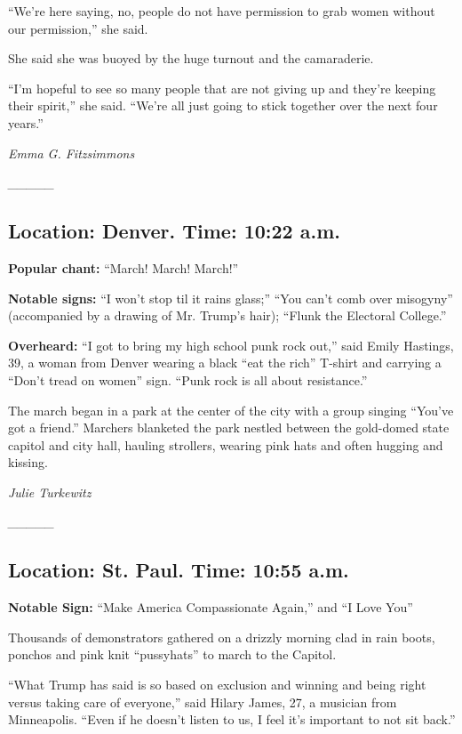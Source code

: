 ``We're here saying, no, people do not have permission to grab women
without our permission,'' she said.

She said she was buoyed by the huge turnout and the camaraderie.

``I'm hopeful to see so many people that are not giving up and they're
keeping their spirit,'' she said. ``We're all just going to stick
together over the next four years.''

\emph{Emma G. Fitzsimmons}

\emph{\_\_\_\_\_}

\hypertarget{location-denver-time-1022-am}{%
\subsection{Location: Denver. Time: 10:22
a.m.}\label{location-denver-time-1022-am}}

\textbf{Popular chant:} ``March! March! March!''

\textbf{Notable signs:} ``I won't stop til it rains glass;'' ``You can't
comb over misogyny'' (accompanied by a drawing of Mr. Trump's hair);
``Flunk the Electoral College.''

\textbf{Overheard:} ``I got to bring my high school punk rock out,''
said Emily Hastings, 39, a woman from Denver wearing a black ``eat the
rich'' T-shirt and carrying a ``Don't tread on women'' sign. ``Punk rock
is all about resistance.''

The march began in a park at the center of the city with a group singing
``You've got a friend.'' Marchers blanketed the park nestled between the
gold-domed state capitol and city hall, hauling strollers, wearing pink
hats and often hugging and kissing.

\emph{Julie Turkewitz}

\emph{\_\_\_\_\_}

\hypertarget{location-st-paul-time-1055-am}{%
\subsection{Location: St. Paul. Time: 10:55
a.m.}\label{location-st-paul-time-1055-am}}

\textbf{Notable Sign:} ``Make America Compassionate Again,'' and ``I
Love You''

Thousands of demonstrators gathered on a drizzly morning clad in rain
boots, ponchos and pink knit ``pussyhats'' to march to the Capitol.

``What Trump has said is so based on exclusion and winning and being
right versus taking care of everyone,'' said Hilary James, 27, a
musician from Minneapolis. ``Even if he doesn't listen to us, I feel
it's important to not sit back.''


